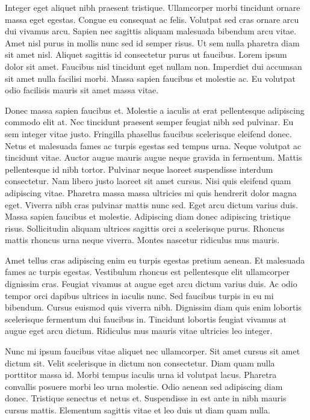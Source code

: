 \documentclass[11pt,a4paper]{article}
\begin{document}
Integer eget aliquet nibh praesent tristique. Ullamcorper morbi tincidunt ornare massa eget egestas. Congue eu consequat ac felis. Volutpat sed cras ornare arcu dui vivamus arcu. Sapien nec sagittis aliquam malesuada bibendum arcu vitae. Amet nisl purus in mollis nunc sed id semper risus. Ut sem nulla pharetra diam sit amet nisl. Aliquet sagittis id consectetur purus ut faucibus. Lorem ipsum dolor sit amet. Faucibus nisl tincidunt eget nullam non. Imperdiet dui accumsan sit amet nulla facilisi morbi. Massa sapien faucibus et molestie ac. Eu volutpat odio facilisis mauris sit amet massa vitae.

Donec massa sapien faucibus et. Molestie a iaculis at erat pellentesque adipiscing commodo elit at. Nec tincidunt praesent semper feugiat nibh sed pulvinar. Eu sem integer vitae justo. Fringilla phasellus faucibus scelerisque eleifend donec. Netus et malesuada fames ac turpis egestas sed tempus urna. Neque volutpat ac tincidunt vitae. Auctor augue mauris augue neque gravida in fermentum. Mattis pellentesque id nibh tortor. Pulvinar neque laoreet suspendisse interdum consectetur. Nam libero justo laoreet sit amet cursus. Nisi quis eleifend quam adipiscing vitae. Pharetra massa massa ultricies mi quis hendrerit dolor magna eget. Viverra nibh cras pulvinar mattis nunc sed. Eget arcu dictum varius duis. Massa sapien faucibus et molestie. Adipiscing diam donec adipiscing tristique risus. Sollicitudin aliquam ultrices sagittis orci a scelerisque purus. Rhoncus mattis rhoncus urna neque viverra. Montes nascetur ridiculus mus mauris.

Amet tellus cras adipiscing enim eu turpis egestas pretium aenean. Et malesuada fames ac turpis egestas. Vestibulum rhoncus est pellentesque elit ullamcorper dignissim cras. Feugiat vivamus at augue eget arcu dictum varius duis. Ac odio tempor orci dapibus ultrices in iaculis nunc. Sed faucibus turpis in eu mi bibendum. Cursus euismod quis viverra nibh. Dignissim diam quis enim lobortis scelerisque fermentum dui faucibus in. Tincidunt lobortis feugiat vivamus at augue eget arcu dictum. Ridiculus mus mauris vitae ultricies leo integer.

Nunc mi ipsum faucibus vitae aliquet nec ullamcorper. Sit amet cursus sit amet dictum sit. Velit scelerisque in dictum non consectetur. Diam quam nulla porttitor massa id. Morbi tempus iaculis urna id volutpat lacus. Pharetra convallis posuere morbi leo urna molestie. Odio aenean sed adipiscing diam donec. Tristique senectus et netus et. Suspendisse in est ante in nibh mauris cursus mattis. Elementum sagittis vitae et leo duis ut diam quam nulla.
\end{document}
